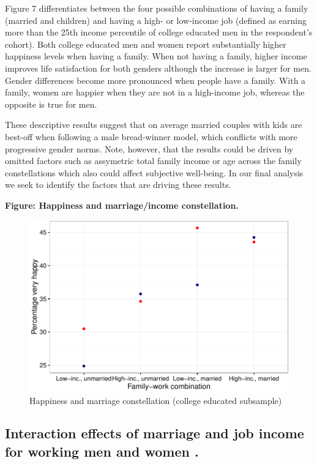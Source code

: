 \documentclass[]{article}
\begin{document}
\textbf{}

Figure 7 differentiates between the four possible combinations of having
a family (married and children) and having a high- or low-income job
(defined as earning more than the 25th income percentile of college
educated men in the respondent's cohort). Both college educated men and
women report substantially higher happiness levels when having a family.
When not having a family, higher income improves life satisfaction for
both genders although the increase is larger for men. Gender differences
become more pronounced when people have a family. With a family, women
are happier when they are not in a high-income job, whereas the opposite
is true for men.

These descriptive results suggest that on average married couples with
kids are best-off when following a male bread-winner model, which
conflicts with more progressive gender norms. Note, however, that the
results could be driven by omitted factors such as assymetric total
family income or age across the family constellations which also could
affect subjective well-being. In our final analysis we seek to identify
the factors that are driving these results.

\textbf{Figure: Happiness and marriage/income constellation.}

\begin{figure}[htbp]
\centering
\includegraphics{Final_Project_P-P_analysis_Unger_files/figure-latex/unnamed-chunk-10-1.pdf}
\caption{Happiness and marriage constellation (college educated
subsample)}
\end{figure}

\subsection{\texorpdfstring{Interaction effects of marriage and job
income for working men and women
\emph{}.}{Interaction effects of marriage and job income for working men and women .}}\label{interaction-effects-of-marriage-and-job-income-for-working-men-and-women-.}
\end{document}
